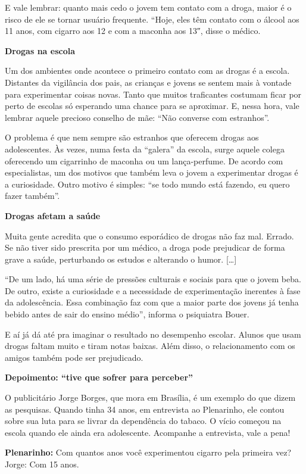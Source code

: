 \begin{itemize}
\begin{itemize}
E vale lembrar: quanto mais cedo o jovem tem contato com a droga, maior
é o risco de ele se tornar usuário frequente. ``Hoje, eles têm contato
com o álcool aos 11 anos, com cigarro aos 12 e com a maconha aos 13″,
disse o médico.

\textbf{Drogas na escola}

Um dos ambientes onde acontece o primeiro contato com as drogas é a
escola. Distantes da vigilância dos pais, as crianças e jovens se sentem
mais à vontade para experimentar coisas novas. Tanto que muitos
traficantes costumam ficar por perto de escolas só esperando uma chance
para se aproximar. E, nessa hora, vale lembrar aquele precioso conselho
de mãe: ``Não converse com estranhos''.

O problema é que nem sempre são estranhos que oferecem drogas aos
adolescentes. Às vezes, numa festa da ``galera'' da escola, surge aquele
colega oferecendo um cigarrinho de maconha ou um lança-perfume. De
acordo com especialistas, um dos motivos que também leva o jovem a
experimentar drogas é a curiosidade. Outro motivo é simples: ``se todo
mundo está fazendo, eu quero fazer também''.

\textbf{Drogas afetam a saúde}

Muita gente acredita que o consumo esporádico de drogas não faz mal.
Errado. Se não tiver sido prescrita por um médico, a droga pode
prejudicar de forma grave a saúde, perturbando os estudos e alterando o
humor. {[}\ldots{}{]}

``De um lado, há uma série de pressões culturais e sociais para que o
jovem beba. De outro, existe a curiosidade e a necessidade de
experimentação inerentes à fase da adolescência. Essa combinação faz com
que a maior parte dos jovens já tenha bebido antes de sair do ensino
médio'', informa o psiquiatra Bouer.

E aí já dá até pra imaginar o resultado no desempenho escolar. Alunos
que usam drogas faltam muito e tiram notas baixas. Além disso, o
relacionamento com os amigos também pode ser prejudicado.

\textbf{Depoimento: ``tive que sofrer para perceber''}

O publicitário Jorge Borges, que mora em Brasília, é um exemplo do que
dizem as pesquisas. Quando tinha 34 anos, em entrevista ao Plenarinho,
ele contou sobre sua luta para se livrar da dependência do tabaco. O
vício começou na escola quando ele ainda era adolescente. Acompanhe a
entrevista, vale a pena!

\textbf{Plenarinho:} Com quantos anos você experimentou cigarro pela
primeira vez?\\
Jorge: Com 15 anos.


\end{itemize}
\end{itemize}
